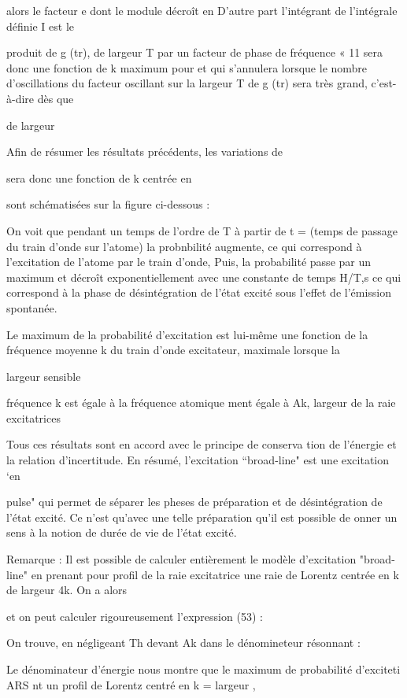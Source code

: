 alors le facteur e dont le module décroît en
D'autre part l'intégrant de l'intégrale définie I est le

produit de g (tr), de largeur T par un facteur de phase de fréquence
 « 11 sera donc une fonction de k maximum pour 
et qui s'annulera lorsque le nombre d'oscillations du facteur oscillant sur la
largeur T de g (tr) sera très grand, c'est-à-dire dès que

 de largeur

Afin de résumer les résultats précédents, les variations de

sera donc une fonction de k centrée en

sont schématisées sur la figure ci-dessous :

On voit que pendant un temps de l'ordre de T à partir de t =
(temps de passage du train d'onde sur l'atome) la probnbilité augmente, ce
qui correspond à l'excitation de l'atome par le train d'onde, Puis, la probabilité passe par un maximum et décroît exponentiellement avec une constante de
temps H/T,s ce qui correspond à la phase de désintégration de l'état excité
sous l'effet de l'émission spontanée.

Le maximum de la probabilité d'excitation est lui-même une fonction de la fréquence moyenne k du train d'onde excitateur, maximale lorsque la

largeur sensible

fréquence k est égale à la fréquence atomique
ment égale à Ak, largeur de la raie excitatrices

Tous ces résultats sont en accord avec le principe de conserva
tion de l'énergie et la relation d'incertitude.
En résumé, l'excitation “broad-line" est une excitation ‘en

pulse" qui permet de séparer les pheses de préparation et de désintégration de
l'état excité. Ce n'est qu'avec une telle préparation qu'il est possible de onner un sens à la notion de durée de vie de l'état excité.

Remarque : Il est possible de calculer entièrement le modèle d'excitation "broad-line"
en prenant pour profil de la raie excitatrice une raie de Lorentz centrée en k
de largeur 4k. On a alors

et on peut calculer rigoureusement l'expression (53) :

On trouve, en négligeant Th devant Ak dans le dénomineteur résonnant :


Le dénominateur d'énergie nous montre que le maximum de probabilité d'exciteti ARS nt un profil de Lorentz centré en k = 
largeur ,

